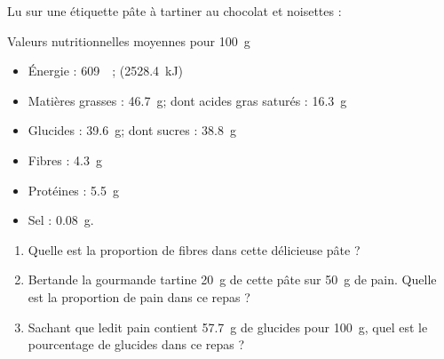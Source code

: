 
Lu sur une étiquette pâte à tartiner au chocolat et noisettes :
\begin{oframed}
    
\begin{center}
Valeurs nutritionnelles moyennes pour \SI{100}{\gram}
\end{center}

\begin{itemize}
    \item Énergie : \SI{609}{\kilo\cal}; (\SI{2528.4}{\kilo\joule})
    \item Matières grasses : \SI{46.7}{\gram}; dont acides gras saturés : \SI{16.3}{\gram}
    \item Glucides : \SI{39.6}{\gram}; dont sucres :  \SI{38.8}{\gram}
    \item Fibres : \SI{4.3}{\gram}
    \item Protéines : \SI{5.5}{\gram}
    \item Sel : \SI{0.08}{\gram}.
\end{itemize}

\end{oframed}
\begin{enumerate}
    \item
        Quelle est la proportion de fibres dans cette délicieuse pâte ?
    \item
        Bertande la gourmande tartine \SI{20}{\gram} de cette pâte sur \SI{50}{\gram} de pain. Quelle est la proportion de pain dans ce repas ?
    \item
        Sachant que ledit pain contient \SI{57.7}{\gram} de glucides pour \SI{100}{\gram}, quel est le pourcentage de glucides dans ce repas ?
\end{enumerate}
